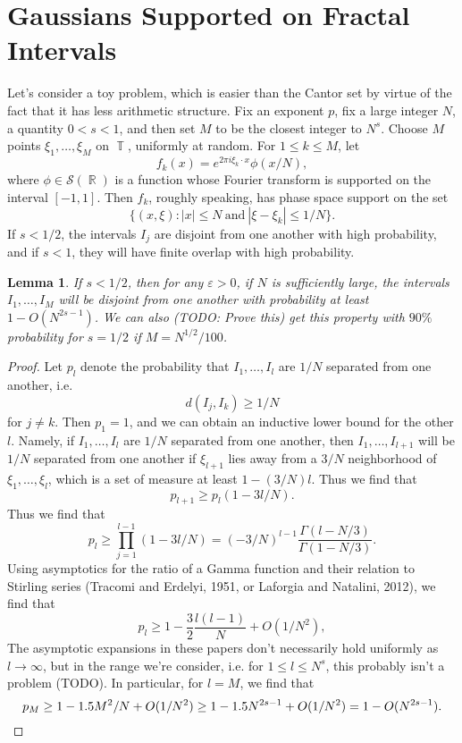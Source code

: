 \documentclass[dvipsnames,letterpaper,12pt]{article}
\numberwithin{equation}{section}
\DeclareMathOperator{\RR}{\mathbb{R}}
\DeclareMathOperator{\TT}{\mathbb{T}}
\newtheorem{lemma}[theorem]{Lemma}
\numberwithin{theorem}{section}
\begin{document}
\section{Gaussians Supported on Fractal Intervals}

Let's consider a toy problem, which is easier than the Cantor set by virtue of the fact that it has less arithmetic structure. Fix an exponent $p$, fix a large integer $N$, a quantity $0 < s < 1$, and then set $M$ to be the closest integer to $N^s$. Choose $M$ points $\xi_1,\dots,\xi_M$ on $\TT$, uniformly at random. For $1 \leq k \leq M$, let
%
\[ f_k(x) = e^{2 \pi i \xi_k \cdot x} \phi(x/N), \]
%
where $\phi \in \mathcal{S}(\RR)$ is a function whose Fourier transform is supported on the interval $[-1,1]$. Then $f_k$, roughly speaking, has phase space support on the set
%
\[ \{ (x,\xi) : |x| \leq N\ \text{and}\ |\xi - \xi_k| \leq 1/N \}. \]
%
If $s < 1/2$, the intervals $I_j$ are disjoint from one another with high probability, and if $s < 1$, they will have finite overlap with high probability.

\begin{lemma}
    If $s < 1/2$, then for any $\varepsilon > 0$, if $N$ is sufficiently large, the intervals $I_1,\dots,I_M$ will be disjoint from one another with probability at least $1 - O(N^{2s - 1})$. We can also (TODO: Prove this) get this property with $90\%$ probability for $s = 1/2$ if $M = N^{1/2} / 100$.
\end{lemma}
\begin{proof}
    Let $p_l$ denote the probability that $I_1,\dots,I_l$ are $1/N$ separated from one another, i.e.
    \[ d(I_j, I_k) \geq 1/N \]
    for $j \neq k$. Then $p_1 = 1$, and we can obtain an inductive lower bound for the other $l$. Namely, if $I_1,\dots,I_l$ are $1/N$ separated from one another, then $I_1,\dots,I_{l+1}$ will be $1/N$ separated from one another if $\xi_{l+1}$ lies away from a $3/N$ neighborhood of $\xi_1,\dots,\xi_l$, which is a set of measure at least $1 - (3/N) l$. Thus we find that
    \[ p_{l+1} \geq p_l (1 - 3l/N). \]
    Thus we find that
    \[ p_l \geq \prod_{j = 1}^{l-1} (1 - 3l/N) = (-3/N)^{l-1} \frac{\Gamma(l - N/3)}{\Gamma(1 - N/3)}. \]
    Using asymptotics for the ratio of a Gamma function and their relation to Stirling series (Tracomi and Erdelyi, 1951, or Laforgia and Natalini, 2012), we find that
    \[ p_l \geq 1 - \frac{3}{2} \frac{l(l-1)}{N} + O(1/N^2), \]
    The asymptotic expansions in these papers don't necessarily hold uniformly as $l \to \infty$, but in the range we're consider, i.e. for $1 \leq l \leq N^s$, this probably isn't a problem (TODO). In particular, for $l = M$, we find that
    \[ p_M \geq 1 - 1.5 M^2 / N + O(1/N^2) \geq 1 - 1.5 N^{2s - 1} + O(1/N^2) = 1 - O(N^{2s-1}). \qedhere \]
\end{proof}
\end{document}
